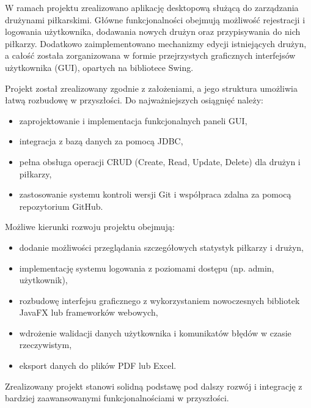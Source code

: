 \documentclass{urdpl}     %
\begin{document}
W ramach projektu zrealizowano aplikację desktopową służącą do zarządzania drużynami piłkarskimi. Główne funkcjonalności obejmują możliwość rejestracji i logowania użytkownika, dodawania nowych drużyn oraz przypisywania do nich piłkarzy. Dodatkowo zaimplementowano mechanizmy edycji istniejących drużyn, a całość została zorganizowana w formie przejrzystych graficznych interfejsów użytkownika (GUI), opartych na bibliotece Swing.

Projekt został zrealizowany zgodnie z założeniami, a jego struktura umożliwia łatwą rozbudowę w przyszłości. Do najważniejszych osiągnięć należy:

\begin{itemize}
  \item zaprojektowanie i implementacja funkcjonalnych paneli GUI,
  \item integracja z bazą danych za pomocą JDBC,
  \item pełna obsługa operacji CRUD (Create, Read, Update, Delete) dla drużyn i piłkarzy,
  \item zastosowanie systemu kontroli wersji Git i współpraca zdalna za pomocą repozytorium GitHub.
\end{itemize}

Możliwe kierunki rozwoju projektu obejmują:

\begin{itemize}
  \item dodanie możliwości przeglądania szczegółowych statystyk piłkarzy i drużyn,
  \item implementację systemu logowania z poziomami dostępu (np. admin, użytkownik),
  \item rozbudowę interfejsu graficznego z wykorzystaniem nowoczesnych bibliotek JavaFX lub frameworków webowych,
  \item wdrożenie walidacji danych użytkownika i komunikatów błędów w czasie rzeczywistym,
  \item eksport danych do plików PDF lub Excel.
\end{itemize}

Zrealizowany projekt stanowi solidną podstawę pod dalszy rozwój i integrację z bardziej zaawansowanymi funkcjonalnościami w przyszłości.

\clearpage
\listoffigures


\end{document}

